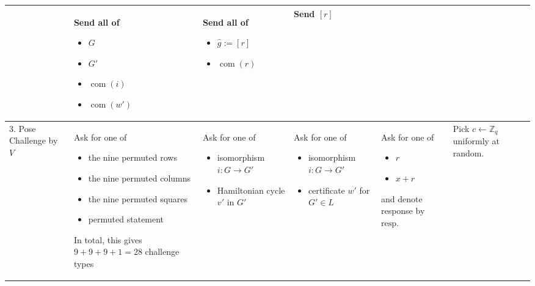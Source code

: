 \documentclass[border=1cm,varwidth=37cm]{standalone}
\DeclareMathOperator\com{com}
\newcommand\graph{G}
\newcommand\graphP{G'}
\newcommand\graphSolutionP{v'}
\newcommand\graphCertP{w'}
\newcommand\response{\text{resp.}}
\begin{document}
\begin{threeparttable}
\begin{tabular}{m{4cm}|m{6cm}|m{6cm}|m{6cm}|m{6cm}|m{6cm}}
	&Send all of
	\begin{itemize}
		\item $\graph$
		\item $\graphP$
		\item $\com(i)$
		\item $\com(\graphCertP)$
	\end{itemize}
	&Send all of
	\begin{itemize}
			\item $\hat{g} := [r]$
			\item $\com(r)$
	\end{itemize}
	&Send $[r]$\\\hline
	3. Pose Challenge by $V$
	&Ask for one of
	\begin{itemize}
		\item the nine permuted rows
		\item the nine permuted columns
		\item the nine permuted squares
		\item permuted statement
	\end{itemize}
	In total, this gives $9+9+9+1 = 28$ challenge types
	&Ask for one of\begin{itemize}
		\item isomorphism $i\colon\graph \to \graphP$
		\item Hamiltonian cycle $\graphSolutionP$ in $\graphP$
	\end{itemize}
	& Ask for one of\begin{itemize}
		\item isomorphism $i\colon\graph \to \graphP$
		\item certificate $\graphCertP$ for $\graphP \in L$
	\end{itemize}
	& Ask for one of\begin{itemize}
		\item $r$
		\item $x + r$
	\end{itemize} and denote response by $\response$
	& Pick $c \leftarrow \mathbb{Z}_q$ uniformly at random.


\end{tabular}
\end{threeparttable}
\end{document}
